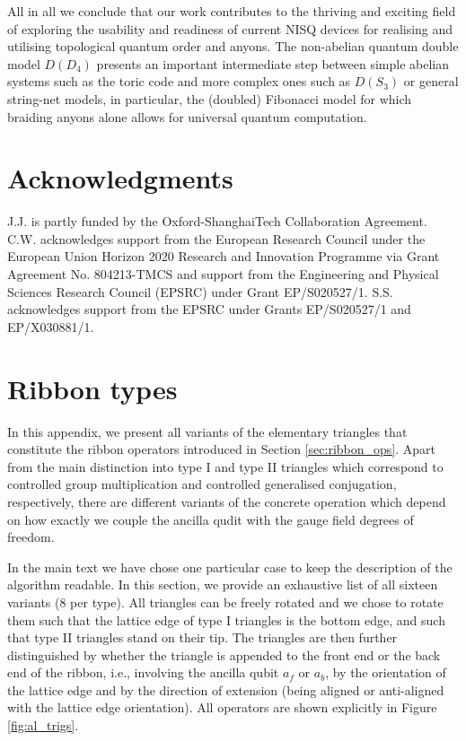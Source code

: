 \documentclass[a4paper,twocolumn,11pt, accepted=2024-06-14]{quantumarticle}
\begin{document}
All in all we conclude that our work contributes to the thriving and exciting field of exploring the usability and readiness of current NISQ devices for realising and utilising topological quantum order and anyons. The non-abelian quantum double model $D(D_4)$ presents an important intermediate step between simple abelian systems such as the toric code and more complex ones such as $D(S_3)$ or general string-net models, in particular, the (doubled) Fibonacci model for which braiding anyons alone allows for universal quantum computation. 

\section*{Acknowledgments}
J.J. is partly funded by the Oxford-ShanghaiTech Collaboration Agreement.
C.W. acknowledges support from the European Research Council under the
European Union Horizon 2020 Research and Innovation
Programme via Grant Agreement No. 804213-TMCS and support from the Engineering and Physical Sciences Research Council (EPSRC) under Grant EP/S020527/1. S.S. acknowledges support from the EPSRC under Grants EP/S020527/1 and EP/X030881/1.

\FloatBarrier
\onecolumn
\appendix

\section{Ribbon types}\label{app:ribs}


In this appendix, we present all variants of the elementary triangles that constitute the ribbon operators introduced in Section \ref{sec:ribbon_ops}. Apart from the main distinction into type I and type II triangles which correspond to controlled group multiplication and controlled generalised conjugation, respectively, there are different variants of the concrete operation which depend on how exactly we couple the ancilla qudit with the gauge field degrees of freedom.

In the main text we have chose one particular case to keep the description of the algorithm readable. In this section, we provide an exhaustive list of all sixteen variants (8 per type). All triangles can be freely rotated and we chose to rotate them such that the lattice edge of type I triangles is the bottom edge, and such that type II triangles stand on their tip. The triangles are then further distinguished by whether the triangle is appended to the front end or the back end of the ribbon, i.e., involving the ancilla qubit $a_f$ or $a_b$, by the orientation of the lattice edge and by the direction of extension (being aligned or anti-aligned with the lattice edge orientation). All operators are shown explicitly in Figure \ref{fig:al_trigs}. 
\end{document}
